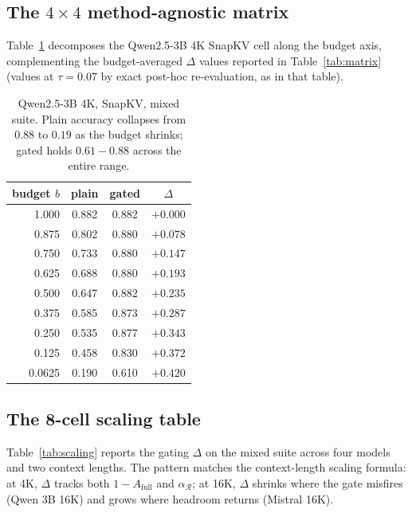 \documentclass{article}
\begin{document}
\subsection{The $4 \times 4$ method-agnostic matrix}

Table~\ref{tab:qwen3b-curve} decomposes the Qwen2.5-3B 4K SnapKV cell
along the budget axis, complementing the
budget-averaged $\Delta$ values reported in Table~\ref{tab:matrix}
(values at $\tau = 0.07$ by exact post-hoc re-evaluation, as in that
table).

\begin{table}[h]
\centering
\caption{Qwen2.5-3B 4K, SnapKV, mixed suite. Plain accuracy collapses
from $0.88$ to $0.19$ as the budget shrinks; gated holds $0.61-0.88$
across the entire range.}
\label{tab:qwen3b-curve}
\begin{tabular}{rccc}
\toprule
budget $b$ & plain & gated & $\Delta$ \\
\midrule
1.000  & 0.882 & 0.882 & $+0.000$ \\
0.875  & 0.802 & 0.880 & $+0.078$ \\
0.750  & 0.733 & 0.880 & $+0.147$ \\
0.625  & 0.688 & 0.880 & $+0.193$ \\
0.500  & 0.647 & 0.882 & $+0.235$ \\
0.375  & 0.585 & 0.873 & $+0.287$ \\
0.250  & 0.535 & 0.877 & $+0.343$ \\
0.125  & 0.458 & 0.830 & $+0.372$ \\
0.0625 & 0.190 & 0.610 & $+0.420$ \\
\bottomrule
\end{tabular}
\end{table}

\subsection{The 8-cell scaling table}

Table~\ref{tab:scaling} reports the gating $\Delta$ on the mixed suite
across four models and two context lengths. The pattern matches the
context-length scaling formula: at 4K, $\Delta$ tracks both $1 -
A_{\mathrm{full}}$ and $\alpha_{\mathcal{R}}$; at 16K, $\Delta$ shrinks where
the gate misfires (Qwen 3B 16K) and grows where headroom returns
(Mistral 16K).
\end{document}
